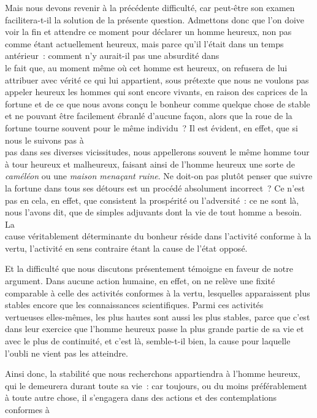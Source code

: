 \documentclass[french,twoside]{book} %
\begin{document}
Mais nous devons revenir à la précédente difficulté, car peut-être son examen facilitera-t-il la solution de la présente question. Admettons donc que l’on doive voir la fin et attendre ce moment pour déclarer un homme heureux, non pas comme étant actuellement heureux, mais parce qu’il l’était dans un temps antérieur : comment n’y aurait-il pas une absurdité dans \\
le fait que, au moment même où cet homme est heureux, on refusera de lui attribuer avec vérité ce qui lui appartient, sous  prétexte que nous ne voulons pas appeler heureux les hommes qui sont encore vivants, en raison des caprices de la fortune et de ce que nous avons conçu le bonheur comme quelque chose de stable et ne pouvant être facilement ébranlé d’aucune façon, alors que la roue de la fortune tourne souvent pour le même individu ? Il est évident, en effet, que si nous le suivons pas à \\
pas dans ses diverses vicissitudes, nous appellerons souvent le même homme tour à tour heureux et malheureux, faisant ainsi de l’homme heureux une sorte de {\itshape caméléon} ou une {\itshape maison menaçant ruine}. Ne doit-on pas plutôt penser que suivre la fortune dans tous ses détours est un procédé absolument incorrect ? Ce n’est pas en cela, en effet, que consistent la prospérité ou l’adversité : ce ne sont là, nous l’avons dit, que de simples adjuvants dont la vie de tout homme a besoin. La \\
cause véritablement déterminante du bonheur réside dans l’activité conforme à la vertu, l’activité en sens contraire étant la cause de l’état opposé.\par
Et la difficulté que nous discutons présentement témoigne en faveur de notre argument. Dans aucune action humaine, en effet, on ne relève une fixité comparable à celle des activités conformes à la vertu, lesquelles apparaissent plus stables encore que les connaissances scientifiques. Parmi ces activités \\
vertueuses elles-mêmes, les plus hautes sont aussi les plus stables, parce que c’est dans leur exercice que l’homme heureux passe la plus grande partie de sa vie et avec le plus de continuité, et c’est là, semble-t-il bien, la cause pour laquelle l’oubli ne vient pas les atteindre.\par
Ainsi donc, la stabilité que nous recherchons appartiendra à l’homme heureux, qui le demeurera durant toute sa vie : car toujours, ou du moins préférablement à toute autre chose, il s’engagera dans des actions et des contemplations conformes à \\
\end{document}
